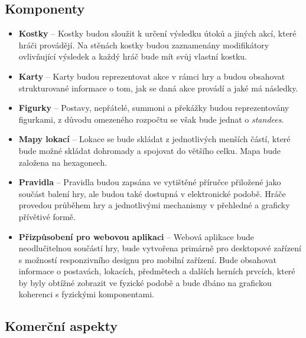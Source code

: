 \subsection{Komponenty}
\label{subsec:req_components}

\begin{itemize}
    \item \textbf{Kostky} -- 
        Kostky budou sloužit k určení výsledku útoků a jiných akcí, které hráči provádějí. Na stěnách kostky budou zaznamenány modifikátory ovlivňující výsledek a každý hráč bude mít svůj vlastní kostku.
    \item \textbf{Karty} --
        Karty budou reprezentovat akce v rámci hry a budou obsahovat strukturované informace o tom, jak se daná akce provádí a jaké má následky.
    \item \textbf{Figurky} --
        Postavy, nepřátelé, summoni a překážky budou reprezentovány figurkami, z důvodu omezeného rozpočtu se však bude jednat o \textit{standees}.
    \item \textbf{Mapy lokací} --
        Lokace se bude skládat z jednotlivých menších částí, které bude možné skládat dohromady a spojovat do většího celku. Mapa bude založena na hexagonech.
    \item \textbf{Pravidla} --
        Pravidla budou zapsána ve vytištěné příručce přiložené jako součást balení hry, ale budou také dostupná v elektronické podobě. Hráče provedou průběhem hry a jednotlivými mechanismy v přehledné a graficky přívětivé formě.
    \item \textbf{Přizpůsobení pro webovou aplikaci} --
        Webová aplikace bude neodlučitelnou součástí hry, bude vytvořena primárně pro desktopové zařízení s možností responzivního designu pro mobilní zařízení. Bude obsahovat informace o postavách, lokacích, předmětech a dalších herních prvcích, které by byly obtížné zobrazit ve fyzické podobě a bude dbáno na grafickou koherenci s fyzickými komponentami.
\end{itemize}

\subsection{Komerční aspekty}
\label{subsec:req_commercial}

